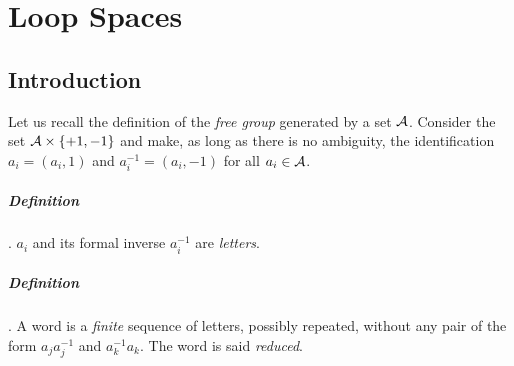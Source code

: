 \chapter{Loop Spaces}

\section{Introduction}

Let us recall the definition of the  {\em free group} generated by a set ${\cal A}$. 
Consider the set ${\cal A}\times \lbrace +1, -1 \rbrace$ and
make, as long as there is no ambiguity, the identification $a_i= (a_i,1)$ and $a_i^{-1}= (a_i,-1)$ 
for all $a_i\in{\cal A}$.

\paragraph{Definition}.  $a_i$ and its formal inverse $a_i^{-1}$ are  {\em letters}.

\paragraph{Definition}. A word is a {\em finite} sequence of letters, possibly repeated,
without any pair of the form $a_ja_j^{-1}$ and $a_k^{-1}a_k$. The word is said {\em reduced}.

